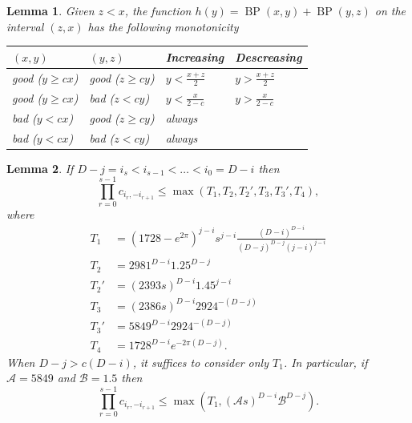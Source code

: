 \documentclass[10pt,a4paper]{amsart}
\newtheorem{lemma}{Lemma}
\newcommand{\BP}{\operatorname{BP}}
\begin{document}
\begin{lemma}\label{l:BPdiff}
Given $z< x$, the function $h(y)=\BP(x,y)+\BP(y,z)$ on
the interval $(z,x)$ has the following monotonicity
\begin{center}
\begin{tabular}{llll}
  $(x,y)$&$(y,z)$&Increasing&Descreasing\\
  \hline
  good ($y\geq cx$)&good ($z\geq cy$)&$y< \frac{x+z}{2}$&$y> \frac{x+z}{2}$\\
  good ($y\geq cx$)&bad ($z< cy$)&$y< \frac{x}{2-c}$&$y> \frac{x}{2-c}$\\
  bad ($y< cx$)&good ($z\geq cy$)&always&\\
  bad ($y< cx$)&bad ($z< cy$)&always&
\end{tabular}
\end{center}
\end{lemma}

\begin{lemma}\label{l:BP}
If $D-j=i_s<i_{s-1}<\ldots<i_0=D-i$ then
\[\prod_{r=0}^{s-1}c_{i_r,-i_{r+1}}\leq \max(T_1,T_2,T_2',T_3,T_3',T_4),\]
where
\begin{align*}
  T_1&=(1728-e^{2\pi})^{j-i}s^{j-i}\frac{(D-i)^{D-i}}{(D-j)^{D-j}(j-i)^{j-i}}\\
  T_2&=2981^{D-i}1.25^{D-j}\\
  T_2'&=(2393s)^{D-i}1.45^{j-i}\\
  T_3&=(2386s)^{D-i}2924^{-(D-j)}\\
  T_3'&=5849^{D-i}2924^{-(D-j)}\\
  T_4&=1728^{D-i}e^{-2\pi (D-j)}.
\end{align*}
When $D-j>c(D-i)$, it suffices to consider only $T_1$. In
particular, if $\mathcal{A}=5849$ and $\mathcal{B} = 1.5$ then
\[\prod_{r=0}^{s-1}c_{i_r,-i_{r+1}}\leq \max(T_1,(\mathcal{A}s)^{D-i}\mathcal{B}^{D-j}).\]
\end{lemma}
\end{document}
